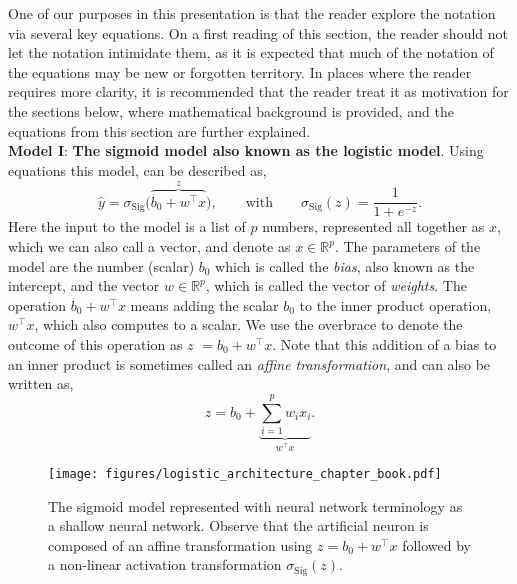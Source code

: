 \documentclass[12pt]{article}
\begin{document}
One of our purposes in this presentation is that the reader explore the notation via several key equations. On a first reading of this section, the reader should not let the notation intimidate them, as it is expected that much of the notation of the equations may be new or forgotten territory. In places where the reader requires more clarity, it is recommended that the reader treat it as motivation for the sections below, where mathematical background is provided, and the equations from this section are further explained. \\

\noindent
{\bf Model I}: {\bf The sigmoid model also known as the logistic model}. Using equations this model, can be described as,
%
\begin{equation}
\label{eq:first-shallow-view}
\hat{y}=\sigma_{\text{Sig}}\big(\overbrace{b_0+w^\top  x}^{z}\big),
\qquad
\text{with}
\qquad
\sigma_{\text{Sig}}(z) = \frac{1}{1+e^{-z}}.
\end{equation}
%
Here the input to the model is a list of $p$ numbers, represented all together as $x$, which we can also call a vector, and denote as $x\in {\mathbb R}^p$. The parameters of the model are the number (scalar) $b_0$ which is called the {\em bias}, also known as the intercept, and the vector $w\in {\mathbb R}^p$, which is called the vector of {\em weights}. The operation $b_0 + w^\top x$ means adding the scalar $b_0$ to the inner product operation, $w^\top x$, which also computes to a scalar. We use the overbrace to denote the outcome of this operation as $z$ $=b_0+w^\top x$. Note that this addition of a bias to an inner product is sometimes called an {\em affine transformation}, and can also be written as,
%
\begin{equation}
\label{eq:smallz-only-log-mult}
z = b_0 + \underbrace{\sum_{i=1}^p w_i x_i}_{w^\top x}.
\end{equation}

\begin{figure}[h]
\begin{center}
\texttt{[image: figures/logistic\_architecture\_chapter\_book.pdf]}
\end{center}
\caption{The sigmoid model represented with neural network terminology as a shallow neural network. Observe that the artificial neuron is composed of an affine transformation using $z = b_0 + w^\top x$ followed by a non-linear activation transformation 
$\sigma_{\text{Sig}}(z)$.} %
\label{fig:niceneuron}
\end{figure}
\end{document}
